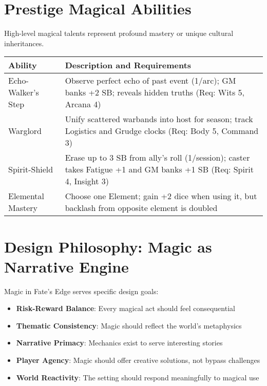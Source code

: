 \section*{Prestige Magical Abilities}

High-level magical talents represent profound mastery or unique cultural inheritances.

\begin{fatebox}
\begin{tabularx}{\textwidth}{lX}
\toprule
\textbf{Ability} & \textbf{Description and Requirements} \\
\midrule
Echo-Walker's Step & Observe perfect echo of past event (1/arc); GM banks +2 SB; reveals hidden truths (Req: Wits 5, Arcana 4) \\
Warglord & Unify scattered warbands into host for season; track Logistics and Grudge clocks (Req: Body 5, Command 3) \\
Spirit-Shield & Erase up to 3 SB from ally's roll (1/session); caster takes Fatigue +1 and GM banks +1 SB (Req: Spirit 4, Insight 3) \\
Elemental Mastery & Choose one Element; gain +2 dice when using it, but backlash from opposite element is doubled \\
\bottomrule
\end{tabularx}
\end{fatebox}

\section*{Design Philosophy: Magic as Narrative Engine}

Magic in Fate's Edge serves specific design goals:

\begin{itemize}
    \item \textbf{Risk-Reward Balance}: Every magical act should feel consequential
    \item \textbf{Thematic Consistency}: Magic should reflect the world's metaphysics
    \item \textbf{Narrative Primacy}: Mechanics exist to serve interesting stories
    \item \textbf{Player Agency}: Magic should offer creative solutions, not bypass challenges
    \item \textbf{World Reactivity}: The setting should respond meaningfully to magical use
\end{itemize}

